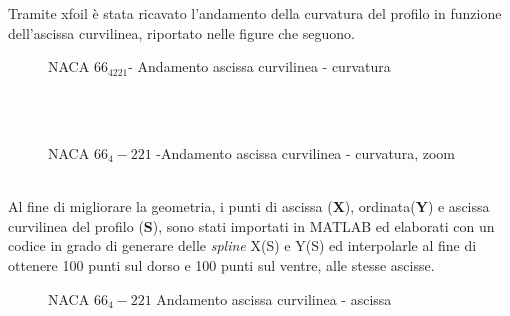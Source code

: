Tramite xfoil è stata ricavato l'andamento della curvatura del profilo in funzione dell'ascissa curvilinea, riportato nelle figure che seguono.\\

\begin{figure} [H]
\centering
{}
\caption{\footnotesize NACA $66_4221$- Andamento ascissa curvilinea - curvatura }
\end{figure}
\noindent
 \\ \\

\begin{figure} [H]
\centering
{}
\caption{\footnotesize  NACA $66_4-221$ -Andamento ascissa curvilinea - curvatura, zoom }
\end{figure}
\noindent
 \\

 Al fine di migliorare la geometria, i punti di ascissa ({\bfseries X}), ordinata({\bfseries Y}) e ascissa curvilinea del profilo ({\bfseries S}),  sono stati importati in MATLAB ed elaborati con un codice in grado di generare delle {\itshape spline} X(S) e Y(S) ed interpolarle al fine di ottenere 100 punti sul dorso e 100 punti sul ventre, alle stesse ascisse.

\begin{figure} [h!]
\centering
{}
\caption{\footnotesize NACA $66_4-221$ Andamento ascissa curvilinea - ascissa }
\end{figure}


